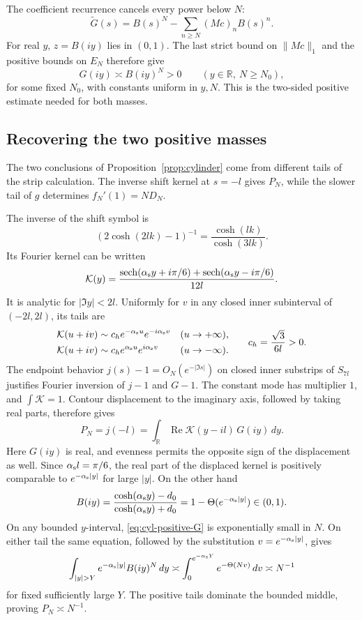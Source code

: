 The coefficient recurrence cancels every power below \(N\):
\[
 \widetilde G(s)
   =B(s)^N-\sum_{n\ge N}(Mc)_n B(s)^n.
\]
For real \(y\), \(z=B(iy)\) lies in \((0,1)\).  The last strict bound
on \(\|Mc\|_1\) and the positive bounds on \(E_N\) therefore give
\begin{equation}\label{eq:cyl-positive-G}
 G(iy)\asymp B(iy)^N>0
 \qquad(y\in\mathbb R,\ N\ge N_0),
\end{equation}
for some fixed \(N_0\), with constants uniform in \(y,N\).
This is the two-sided positive estimate needed for both masses.

\subsection{Recovering the two positive masses}

The two conclusions of Proposition~\ref{prop:cylinder} come from
different tails of the strip calculation.  The inverse shift kernel
at \(s=-l\) gives \(P_N\), while the slower tail of \(g\) determines
\(f_N'(1)=ND_N\).

The inverse of the shift symbol is
\[
 (2\cosh(2lk)-1)^{-1}=\frac{\cosh(lk)}{\cosh(3lk)}.
\]
Its Fourier kernel can be written
\[
 \mathcal K(y)=
 \frac{\operatorname{sech}(\alpha_{\rm s}y+i\pi/6)
       +\operatorname{sech}(\alpha_{\rm s}y-i\pi/6)}{12l}.
\]
It is analytic for \(|\Im y|<2l\).  Uniformly for \(v\) in any closed
inner subinterval of \((-2l,2l)\), its tails are
\[
\begin{aligned}
 \mathcal K(u+iv)&\sim c_h e^{-\alpha_{\rm s}u}e^{-i\alpha_{\rm s}v}
       &&(u\to+\infty),\\
 \mathcal K(u+iv)&\sim c_h e^{\alpha_{\rm s}u}e^{i\alpha_{\rm s}v}
       &&(u\to-\infty).
\end{aligned}
\qquad c_h=\frac{\sqrt3}{6l}>0.
\]
The endpoint behavior
\(j(s)-1=O_N(e^{-|\Im s|})\) on closed inner substrips of \(S_{7l}\)
justifies Fourier inversion of \(j-1\) and \(G-1\).  The constant
mode has multiplier \(1\), and \(\int\mathcal K=1\).  Contour
displacement to the imaginary axis, followed by taking real parts,
therefore gives
\[
 P_N=j(-l)=\int_{\mathbb R}
       \operatorname{Re}\mathcal K(y-il)\,G(iy)\,dy.
\]
Here \(G(iy)\) is real, and evenness permits the opposite sign of
the displacement as well.
Since \(\alpha_{\rm s}l=\pi/6\), the real part of the displaced
kernel is positively comparable to \(e^{-\alpha_{\rm s}|y|}\) for
large \(|y|\).  On the other hand
\[
 B(iy)=\frac{\cosh(\alpha_{\rm s}y)-d_0}
             {\cosh(\alpha_{\rm s}y)+d_0}
       =1-\Theta(e^{-\alpha_{\rm s}|y|})\in(0,1).
\]
On any bounded \(y\)-interval, \eqref{eq:cyl-positive-G} is
exponentially small in \(N\).  On either tail the same equation,
followed by the substitution \(v=e^{-\alpha_{\rm s}|y|}\), gives
\[
 \int_{|y|>Y}e^{-\alpha_{\rm s}|y|}B(iy)^N\,dy
 \asymp \int_0^{e^{-\alpha_{\rm s}Y}}e^{-\Theta(Nv)}\,dv
 \asymp N^{-1}
\]
for fixed sufficiently large \(Y\).  The positive tails dominate the
bounded middle, proving \(P_N\asymp N^{-1}\).


